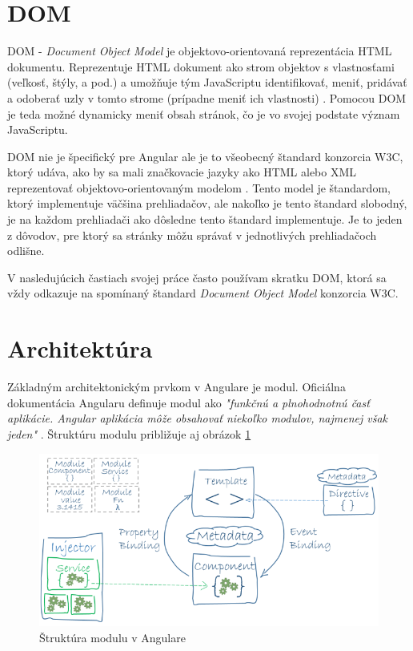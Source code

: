 \documentclass[
  printed, %
  twoside, %
  notable,   %
  nolof,   %
  nolot,   %
]{fithesis3}
\begin{document}
\section{DOM}
DOM - \textit{Document Object Model} je objektovo-orientovaná reprezentácia HTML dokumentu. Reprezentuje HTML dokument ako strom objektov s vlastnosťami (veľkosť, štýly, a pod.) a umožňuje tým JavaScriptu identifikovať, meniť, pridávať a odoberať uzly v tomto strome (prípadne meniť ich vlastnosti) \cite{yang2009topic}. Pomocou DOM je teda možné dynamicky meniť obsah stránok, čo je vo svojej podstate význam JavaScriptu.

DOM nie je špecifický pre Angular ale je to všeobecný štandard konzorcia W3C, ktorý udáva, ako by sa mali značkovacie jazyky ako HTML alebo XML reprezentovať objektovo-orientovaným modelom \cite{wood1999programming}. Tento model je štandardom, ktorý implementuje väčšina prehliadačov, ale nakoľko je tento štandard slobodný, je na každom prehliadači ako dôsledne tento štandard implementuje. Je to jeden z dôvodov, pre ktorý sa stránky môžu správať v jednotlivých prehliadačoch odlišne.

V nasledujúcich častiach svojej práce často používam skratku DOM, ktorá sa vždy odkazuje na spomínaný štandard \textit{Document Object Model} konzorcia W3C.

\section{Architektúra}
Základným architektonickým prvkom v Angulare je modul. Oficiálna dokumentácia Angularu definuje modul ako \textit{"funkčnú a plnohodnotnú časť aplikácie. Angular aplikácia môže obsahovať niekoľko modulov, najmenej však jeden"} \cite{angular}. Štruktúru modulu približuje aj obrázok \ref{angular_architecture}

\begin{figure}[H]
	\center
	\includegraphics[width=1.0\linewidth]{angular_architecture}
	\caption{Štruktúra modulu v Angulare\cite{angular}}
	\label{angular_architecture}
\end{figure}
\end{document}
